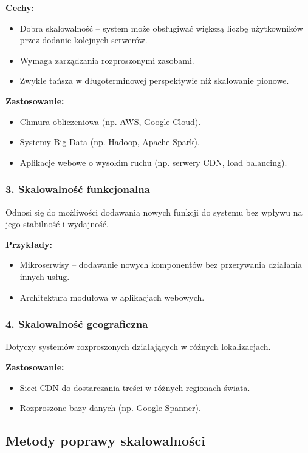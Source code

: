 \textbf{Cechy:}
\begin{itemize}
    \item Dobra skalowalność – system może obsługiwać większą liczbę użytkowników przez dodanie kolejnych serwerów.
    \item Wymaga zarządzania rozproszonymi zasobami.
    \item Zwykle tańsza w długoterminowej perspektywie niż skalowanie pionowe.
\end{itemize}

\textbf{Zastosowanie:}
\begin{itemize}
    \item Chmura obliczeniowa (np. AWS, Google Cloud).
    \item Systemy Big Data (np. Hadoop, Apache Spark).
    \item Aplikacje webowe o wysokim ruchu (np. serwery CDN, load balancing).
\end{itemize}

\subsubsection{3. Skalowalność funkcjonalna}
Odnosi się do możliwości dodawania nowych funkcji do systemu bez wpływu na jego stabilność i wydajność.

\textbf{Przykłady:}
\begin{itemize}
    \item Mikroserwisy – dodawanie nowych komponentów bez przerywania działania innych usług.
    \item Architektura modułowa w aplikacjach webowych.
\end{itemize}

\subsubsection{4. Skalowalność geograficzna}
Dotyczy systemów rozproszonych działających w różnych lokalizacjach.

\textbf{Zastosowanie:}
\begin{itemize}
    \item Sieci CDN do dostarczania treści w różnych regionach świata.
    \item Rozproszone bazy danych (np. Google Spanner).
\end{itemize}

\subsection{Metody poprawy skalowalności}

